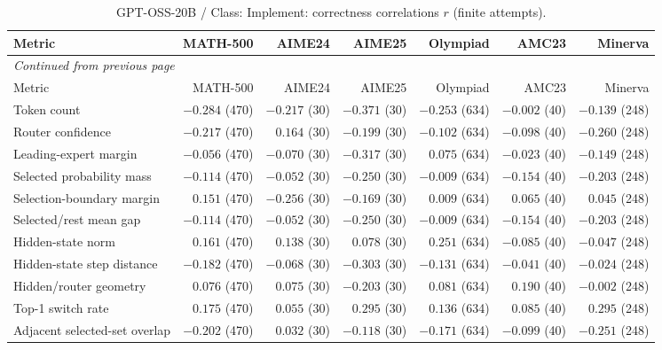 \begingroup\scriptsize\setlength{\tabcolsep}{4pt}
\begin{longtable}{@{}lrrrrrr@{}}
\caption{GPT-OSS-20B / Class: Implement: correctness correlations $r$ (finite attempts).}\label{tab:multi-gptoss-class-Implement}\\
\toprule
Metric & MATH-500 & AIME24 & AIME25 & Olympiad & AMC23 & Minerva \\
\midrule\endfirsthead
\multicolumn{7}{l}{\textit{Continued from previous page}}\\
\toprule
Metric & MATH-500 & AIME24 & AIME25 & Olympiad & AMC23 & Minerva \\
\midrule\endhead
\bottomrule\endfoot
Token count & $-0.284$ (470) & $-0.217$ (30) & $-0.371$ (30) & $-0.253$ (634) & $-0.002$ (40) & $-0.139$ (248) \\
Router confidence & $-0.217$ (470) & $0.164$ (30) & $-0.199$ (30) & $-0.102$ (634) & $-0.098$ (40) & $-0.260$ (248) \\
Leading-expert margin & $-0.056$ (470) & $-0.070$ (30) & $-0.317$ (30) & $0.075$ (634) & $-0.023$ (40) & $-0.149$ (248) \\
Selected probability mass & $-0.114$ (470) & $-0.052$ (30) & $-0.250$ (30) & $-0.009$ (634) & $-0.154$ (40) & $-0.203$ (248) \\
Selection-boundary margin & $0.151$ (470) & $-0.256$ (30) & $-0.169$ (30) & $0.009$ (634) & $0.065$ (40) & $0.045$ (248) \\
Selected/rest mean gap & $-0.114$ (470) & $-0.052$ (30) & $-0.250$ (30) & $-0.009$ (634) & $-0.154$ (40) & $-0.203$ (248) \\
Hidden-state norm & $0.161$ (470) & $0.138$ (30) & $0.078$ (30) & $0.251$ (634) & $-0.085$ (40) & $-0.047$ (248) \\
Hidden-state step distance & $-0.182$ (470) & $-0.068$ (30) & $-0.303$ (30) & $-0.131$ (634) & $-0.041$ (40) & $-0.024$ (248) \\
Hidden/router geometry & $0.076$ (470) & $0.075$ (30) & $-0.203$ (30) & $0.081$ (634) & $0.190$ (40) & $-0.002$ (248) \\
Top-1 switch rate & $0.175$ (470) & $0.055$ (30) & $0.295$ (30) & $0.136$ (634) & $0.085$ (40) & $0.295$ (248) \\
Adjacent selected-set overlap & $-0.202$ (470) & $0.032$ (30) & $-0.118$ (30) & $-0.171$ (634) & $-0.099$ (40) & $-0.251$ (248) \\
\end{longtable}\endgroup

